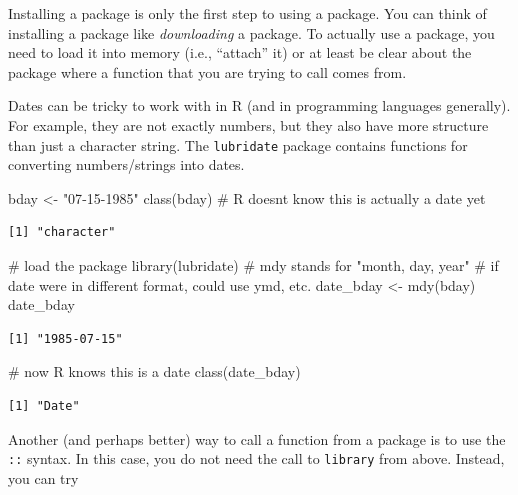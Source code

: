 \documentclass[
  letterpaper,
  DIV=11,
  numbers=noendperiod]{scrreprt}
\newenvironment{Shaded}{\begin{snugshade}}{\end{snugshade}}
\newcommand{\CommentTok}[1]{\textcolor[rgb]{0.37,0.37,0.37}{#1}}
\newcommand{\FunctionTok}[1]{\textcolor[rgb]{0.28,0.35,0.67}{#1}}
\newcommand{\NormalTok}[1]{\textcolor[rgb]{0.00,0.23,0.31}{#1}}
\newcommand{\OtherTok}[1]{\textcolor[rgb]{0.00,0.23,0.31}{#1}}
\newcommand{\StringTok}[1]{\textcolor[rgb]{0.13,0.47,0.30}{#1}}
\begin{document}
Installing a package is only the first step to using a package. You can
think of installing a package like \emph{downloading} a package. To
actually use a package, you need to load it into memory (i.e.,
``attach'' it) or at least be clear about the package where a function
that you are trying to call comes from.

Dates can be tricky to work with in R (and in programming languages
generally). For example, they are not exactly numbers, but they also
have more structure than just a character string. The \texttt{lubridate}
package contains functions for converting numbers/strings into dates.

\begin{Shaded}
\begin{Highlighting}[]
\NormalTok{bday }\OtherTok{\textless{}{-}} \StringTok{"07{-}15{-}1985"}
\FunctionTok{class}\NormalTok{(bday) }\CommentTok{\# R doesn\textquotesingle{}t know this is actually a date yet}
\end{Highlighting}
\end{Shaded}

\begin{verbatim}
[1] "character"
\end{verbatim}

\begin{Shaded}
\begin{Highlighting}[]
\CommentTok{\# load the package}
\FunctionTok{library}\NormalTok{(lubridate)}
\CommentTok{\# mdy stands for "month, day, year"}
\CommentTok{\# if date were in different format, could use ymd, etc.}
\NormalTok{date\_bday }\OtherTok{\textless{}{-}} \FunctionTok{mdy}\NormalTok{(bday)}
\NormalTok{date\_bday}
\end{Highlighting}
\end{Shaded}

\begin{verbatim}
[1] "1985-07-15"
\end{verbatim}

\begin{Shaded}
\begin{Highlighting}[]
\CommentTok{\# now R knows this is a date}
\FunctionTok{class}\NormalTok{(date\_bday)}
\end{Highlighting}
\end{Shaded}

\begin{verbatim}
[1] "Date"
\end{verbatim}

Another (and perhaps better) way to call a function from a package is to
use the \texttt{::} syntax. In this case, you do not need the call to
\texttt{library} from above. Instead, you can try
\end{document}
